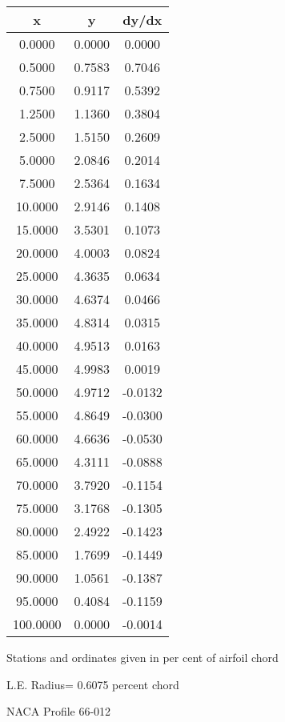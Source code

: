\documentclass[11pt]{book}
\begin{document}
 \vspace{8mm}
 \begin{tabular}{|c|c|c|} \hline 
  x  &  y  &  dy/dx \\
 \hline
0.0000 & 0.0000 & 0.0000 \\
0.5000 & 0.7583 & 0.7046 \\
0.7500 & 0.9117 & 0.5392 \\
1.2500 & 1.1360 & 0.3804 \\
2.5000 & 1.5150 & 0.2609 \\
5.0000 & 2.0846 & 0.2014 \\
7.5000 & 2.5364 & 0.1634 \\
10.0000 & 2.9146 & 0.1408 \\
15.0000 & 3.5301 & 0.1073 \\
20.0000 & 4.0003 & 0.0824 \\
25.0000 & 4.3635 & 0.0634 \\
30.0000 & 4.6374 & 0.0466 \\
35.0000 & 4.8314 & 0.0315 \\
40.0000 & 4.9513 & 0.0163 \\
45.0000 & 4.9983 & 0.0019 \\
50.0000 & 4.9712 & -0.0132 \\
55.0000 & 4.8649 & -0.0300 \\
60.0000 & 4.6636 & -0.0530 \\
65.0000 & 4.3111 & -0.0888 \\
70.0000 & 3.7920 & -0.1154 \\
75.0000 & 3.1768 & -0.1305 \\
80.0000 & 2.4922 & -0.1423 \\
85.0000 & 1.7699 & -0.1449 \\
90.0000 & 1.0561 & -0.1387 \\
95.0000 & 0.4084 & -0.1159 \\
100.0000 & 0.0000 & -0.0014 \\
 \hline
 \end{tabular}
 \vspace{8mm}


Stations and ordinates given in per cent of airfoil chord 


L.E. Radius=  0.6075 percent chord
 \newpage
  \label{p66-012}
 \begin{Large}
 NACA Profile 66-012
 \end{Large}
  
\end{document}
